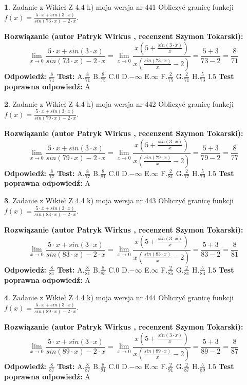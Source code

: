 \documentclass[12pt, a4paper]{article}
\theoremstyle{definition} %
\newtheorem{zad}{}
\newcommand{\zadStart}[1]{\begin{zad}#1\newline}
\newcommand{\zadStop}{\end{zad}}
\newcommand{\rozwStart}[2]{\noindent \textbf{Rozwiązanie (autor #1 , recenzent #2): }\newline}
\newcommand{\rozwStop}{\newline}
\newcommand{\odpStart}{\noindent \textbf{Odpowiedź:}\newline}
\newcommand{\odpStop}{\newline}
\newcommand{\testStart}{\noindent \textbf{Test:}\newline}
\newcommand{\testStop}{\newline}
\newcommand{\kluczStart}{\noindent \textbf{Test poprawna odpowiedź:}\newline}
\newcommand{\kluczStop}{\newline}
\begin{document}
\zadStart{Zadanie z Wikieł Z 4.4 k) moja wersja nr 441}
Obliczyć granicę funkcji $f(x)=\frac{5\cdot x +sin(3\cdot x)}{sin(73\cdot x) -2\cdot x}$.
\zadStop
\rozwStart{Patryk Wirkus}{Szymon Tokarski}
$$\lim\limits_{x\to 0}\frac{5\cdot x +sin(3\cdot x)}{sin(73\cdot x) -2\cdot x}
=\lim\limits_{x\to 0}\frac{x(5+\frac{sin(3\cdot x)}{x})}{x(\frac{sin(73\cdot x)}{x}-2)}
=\frac{5+3}{73-2} = \frac{8}{71}$$
\rozwStop
\odpStart
$\frac{8}{71}$
\odpStop
\testStart
A.$\frac{8}{71}$
B.$\frac{8}{75}$
C.$0$
D.$-\infty$
E.$\infty$
F.$\frac{2}{75}$
G.$\frac{2}{71}$
H.$\frac{5}{73}$
I.$5$
\testStop
\kluczStart
A
\kluczStop



\zadStart{Zadanie z Wikieł Z 4.4 k) moja wersja nr 442}
Obliczyć granicę funkcji $f(x)=\frac{5\cdot x +sin(3\cdot x)}{sin(79\cdot x) -2\cdot x}$.
\zadStop
\rozwStart{Patryk Wirkus}{Szymon Tokarski}
$$\lim\limits_{x\to 0}\frac{5\cdot x +sin(3\cdot x)}{sin(79\cdot x) -2\cdot x}
=\lim\limits_{x\to 0}\frac{x(5+\frac{sin(3\cdot x)}{x})}{x(\frac{sin(79\cdot x)}{x}-2)}
=\frac{5+3}{79-2} = \frac{8}{77}$$
\rozwStop
\odpStart
$\frac{8}{77}$
\odpStop
\testStart
A.$\frac{8}{77}$
B.$\frac{8}{81}$
C.$0$
D.$-\infty$
E.$\infty$
F.$\frac{2}{81}$
G.$\frac{2}{77}$
H.$\frac{5}{79}$
I.$5$
\testStop
\kluczStart
A
\kluczStop



\zadStart{Zadanie z Wikieł Z 4.4 k) moja wersja nr 443}
Obliczyć granicę funkcji $f(x)=\frac{5\cdot x +sin(3\cdot x)}{sin(83\cdot x) -2\cdot x}$.
\zadStop
\rozwStart{Patryk Wirkus}{Szymon Tokarski}
$$\lim\limits_{x\to 0}\frac{5\cdot x +sin(3\cdot x)}{sin(83\cdot x) -2\cdot x}
=\lim\limits_{x\to 0}\frac{x(5+\frac{sin(3\cdot x)}{x})}{x(\frac{sin(83\cdot x)}{x}-2)}
=\frac{5+3}{83-2} = \frac{8}{81}$$
\rozwStop
\odpStart
$\frac{8}{81}$
\odpStop
\testStart
A.$\frac{8}{81}$
B.$\frac{8}{85}$
C.$0$
D.$-\infty$
E.$\infty$
F.$\frac{2}{85}$
G.$\frac{2}{81}$
H.$\frac{5}{83}$
I.$5$
\testStop
\kluczStart
A
\kluczStop



\zadStart{Zadanie z Wikieł Z 4.4 k) moja wersja nr 444}
Obliczyć granicę funkcji $f(x)=\frac{5\cdot x +sin(3\cdot x)}{sin(89\cdot x) -2\cdot x}$.
\zadStop
\rozwStart{Patryk Wirkus}{Szymon Tokarski}
$$\lim\limits_{x\to 0}\frac{5\cdot x +sin(3\cdot x)}{sin(89\cdot x) -2\cdot x}
=\lim\limits_{x\to 0}\frac{x(5+\frac{sin(3\cdot x)}{x})}{x(\frac{sin(89\cdot x)}{x}-2)}
=\frac{5+3}{89-2} = \frac{8}{87}$$
\rozwStop
\odpStart
$\frac{8}{87}$
\odpStop
\testStart
A.$\frac{8}{87}$
B.$\frac{8}{91}$
C.$0$
D.$-\infty$
E.$\infty$
F.$\frac{2}{91}$
G.$\frac{2}{87}$
H.$\frac{5}{89}$
I.$5$
\testStop
\kluczStart
A
\kluczStop
\end{document}

